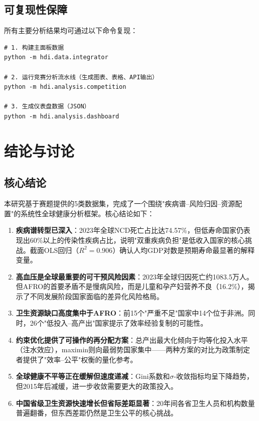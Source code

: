 \documentclass[12pt,a4paper]{ctexart}
\begin{document}
\subsection{可复现性保障}

所有主要分析结果均可通过以下命令复现：

\begin{verbatim}
# 1. 构建主面板数据
python -m hdi.data.integrator

# 2. 运行竞赛分析流水线（生成图表、表格、API输出）
python -m hdi.analysis.competition

# 3. 生成仪表盘数据（JSON）
python -m hdi.analysis.dashboard
\end{verbatim}

\section{结论与讨论}

\subsection{核心结论}

本研究基于赛题提供的5类数据集，完成了一个围绕"疾病谱--风险归因--资源配置"的系统性全球健康分析框架。核心结论如下：

\begin{enumerate}[label=\textbf{C\arabic*.}]
    \item \textbf{疾病谱转型已深入}：2023年全球NCD死亡占比达74.57\%，但低寿命国家仍表现出60\%以上的传染性疾病占比，说明"双重疾病负担"是低收入国家的核心挑战。截面OLS回归（$R^2 = 0.906$）确认人均GDP对数是预期寿命最显著的解释变量。

    \item \textbf{高血压是全球最重要的可干预风险因素}：2023年全球归因死亡约1083.5万人。但AFRO的首要矛盾不是慢病风险，而是儿童和孕产妇营养不良（16.2\%），揭示了不同发展阶段国家面临的差异化风险格局。

    \item \textbf{卫生资源缺口高度集中于AFRO}：前15个"严重不足"国家中14个位于非洲。同时，26个"低投入--高产出"国家提示了效率经验复制的可能性。

    \item \textbf{约束优化提供了可操作的再分配方案}：总产出最大化倾向于均等化投入水平（注水效应），maximin则向最弱势国家集中——两种方案的对比为政策制定者提供了"效率--公平"权衡的量化参考。

    \item \textbf{全球健康不平等正在缓解但速度递减}：Gini系数和$\sigma$-收敛指标均呈下降趋势，但2015年后减缓，进一步收敛需要更大的政策投入。

    \item \textbf{中国省级卫生资源快速增长但省际差距显著}：20年间各省卫生人员和机构数量普遍翻番，但东西差距仍然是卫生公平的核心挑战。
\end{enumerate}
\end{document}
